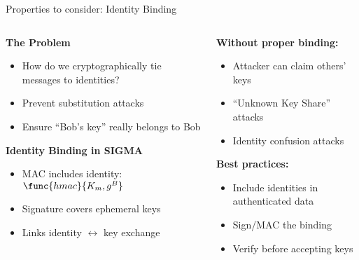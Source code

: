 \documentclass[aspectratio=169, lualatex, handout]{beamer}
\begin{document}
\begin{frame}{Properties to consider: Identity Binding}
	\begin{columns}
		\begin{column}{0.5\textwidth}
			\textbf{The Problem}
			\begin{itemize}
				\item How do we cryptographically tie messages to identities?
				\item Prevent substitution attacks
				\item Ensure ``Bob's key'' really belongs to Bob
			\end{itemize}
			\textbf{Identity Binding in SIGMA}
			\begin{itemize}
				\item MAC includes identity: $\func{hmac}{K_m, g^B}$
				\item Signature covers ephemeral keys
				\item Links identity $\leftrightarrow$ key exchange
			\end{itemize}
		\end{column}
		\begin{column}{0.5\textwidth}
			\textbf{Without proper binding:}
			\begin{itemize}
				\item Attacker can claim others' keys
				\item ``Unknown Key Share'' attacks
				\item Identity confusion attacks
			\end{itemize}
			\textbf{Best practices:}
			\begin{itemize}
				\item Include identities in authenticated data
				\item Sign/MAC the binding
				\item Verify before accepting keys
			\end{itemize}
		\end{column}
	\end{columns}
\end{frame}
\end{document}
